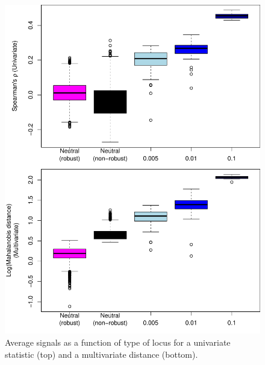 \documentclass[12pt, oneside]{amsart}
\begin{document}
\newpage
\begin{figure}[h]
\begin{center}
\includegraphics[width=6in]{../figures_man2/S6-LandsharcAverageSignals.pdf}
\end{center}
\caption[]{Average signals as a function of type of locus for a univariate statistic (top) and a multivariate distance (bottom).}
 \label{fig:???}
\end{figure}
\end{document}
